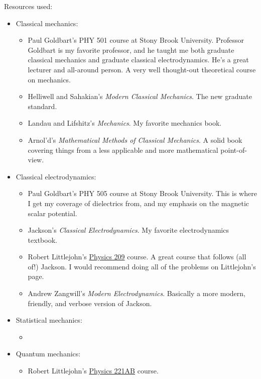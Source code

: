 \documentclass[11pt]{article}
\begin{document}
Resources used:
\begin{itemize}
    \item Classical mechanics:
    \begin{itemize}
        \item Paul Goldbart's PHY 501 course at Stony Brook University.
        Professor Goldbart is my favorite professor, and he taught me
        both graduate classical mechanics and graduate classical electrodynamics.
        He's a great lecturer and all-around person. A very well thought-out
        theoretical course on mechanics.
        \item Helliwell and Sahakian's \emph{Modern Classical Mechanics}.
        The new graduate standard.
        \item Landau and Lifshitz's \emph{Mechanics}. My favorite mechanics book.
        \item Arnol'd's \emph{Mathematical Methods of Classical Mechanics}.
        A solid book covering things from a less applicable and more mathematical
        point-of-view.
    \end{itemize}
    \item Classical electrodynamics:
    \begin{itemize}
        \item Paul Goldbart's PHY 505 course at Stony Brook University.
        This is where I get my coverage of dielectrics from, and my emphasis
        on the magnetic scalar potential.
        \item Jackson's \emph{Classical Electrodynamics}. My favorite electrodynamics
        textbook.
        \item Robert Littlejohn's \href{https://bohr.physics.berkeley.edu/classes/209/f02/209.html}{Physics 209} course. 
        A great course that follows (all of!) Jackson. I would recommend 
        doing all of the problems on Littlejohn's page.
        \item Andrew Zangwill's \emph{Modern Electrodynamics}. Basically a more 
        modern, friendly, and verbose version of Jackson.
    \end{itemize}
    \item Statistical mechanics:
    \begin{itemize}
        \item {}
    \end{itemize}
    \item Quantum mechanics:
    \begin{itemize}
        \item Robert Littlejohn's \href{https://bohr.physics.berkeley.edu/classes/221/2122/221.html}{Physics 221AB} course.
    \end{itemize}
\end{itemize}
\end{document}
